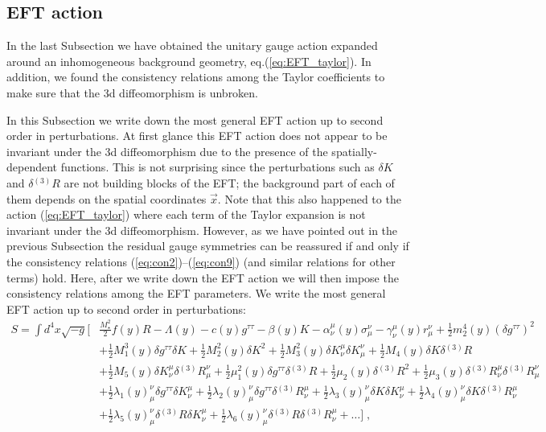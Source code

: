 \documentclass[a4paper,11pt]{article}
\numberwithin{equation}{section}
\begin{document}
 

 \subsection{EFT action}
 
In the last Subsection we have obtained the unitary gauge action expanded around an inhomogeneous background geometry, eq.(\ref{eq:EFT_taylor}). In addition, we found the consistency relations among the Taylor coefficients to make sure that the 3d diffeomorphism is unbroken. 

In this Subsection we write down the most general EFT action up to second order in perturbations. At first glance this EFT action does not appear to be invariant under the 3d diffeomorphism due to the presence of the spatially-dependent functions. This is not surprising since the perturbations such as $\delta K$ and $\delta {}^{(3)}\!R$ are not building blocks of the EFT; the background part of each of them depends on the spatial coordinates $\vec{x}$.  Note that this also happened to the action (\ref{eq:EFT_taylor}) where each term of the Taylor expansion is not invariant under the 3d diffeomorphism. However, as we have pointed out in the previous Subsection the residual gauge symmetries can be reassured if and only if the consistency relations (\ref{eq:con2})--(\ref{eq:con9}) (and similar relations for other terms) hold.  Here, after we write down the EFT action we will then impose the consistency relations among the EFT parameters.
We write the most general EFT action up to second order in perturbations: 
\begin{align}\label{eq:EFT}
S = \int d^4x \sqrt{-g} \bigg[&\frac{M_\star^2}{2}f(y)R - \Lambda(y) - c(y)g^{\tau\tau} - \beta(y) K  - \alpha^\mu_{\nu}(y)\sigma^{\nu}_\mu - \gamma^\mu_{\nu}(y)r^{\nu}_\mu + \frac{1}{2} m_2^4(y) (\delta g^{\tau\tau})^2 \nonumber \\ 
&  + \frac{1}{2} M_1^3(y) \delta g^{\tau\tau} \delta K + \frac{1}{2} M_2^2(y) \delta K^2 + \frac{1}{2} M_3^2(y) \delta K^\mu_\nu \delta K^\nu_\mu + \frac{1}{2}M_4(y) \delta K \delta {}^{(3)}\!R \nonumber \\
& + \frac{1}{2}M_5(y) \delta K^\mu_\nu \delta {}^{(3)}\!R^\nu_\mu + \frac{1}{2}\mu_1^2(y) \delta g^{\tau\tau} \delta {}^{(3)}\!R + \frac{1}{2}\mu_2(y)\delta {}^{(3)}\!R^2 + \frac{1}{2} \mu_3(y) \delta {}^{(3)}\!R^\mu_\nu \delta {}^{(3)}\!R^\nu_\mu \nonumber \\
&+ \frac{1}{2} \lambda_1(y)^\nu_\mu \delta g^{\tau\tau} \delta K^\mu_\nu + \frac{1}{2} \lambda_2(y)^\nu_\mu \delta g^{\tau\tau} \delta {}^{(3)}\!R^\mu_\nu +  \frac{1}{2} \lambda_3(y)^\nu_\mu \delta K \delta K^\mu_\nu +  \frac{1}{2} \lambda_4(y)^\nu_\mu \delta K \delta {}^{(3)}\!R^\mu_\nu \nonumber \\ 
& + \frac{1}{2} \lambda_5(y)^\nu_\mu \delta {}^{(3)}\!R \delta K^\mu_\nu + \frac{1}{2} \lambda_6(y)^\nu_\mu \delta {}^{(3)}\!R \delta {}^{(3)}\!R^\mu_\nu + \ldots \bigg] \;,
\end{align}
\end{document}
